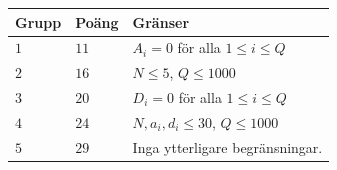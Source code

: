 \noindent
\begin{tabular}{| l | l | p{12cm} |}
  \hline
  \textbf{Grupp} & \textbf{Poäng} & \textbf{Gränser} \\ \hline
  $1$   & $11$       & $A_i = 0$ för alla $1 \leq i \leq Q$\\ \hline
  $2$   & $16$       & $N \leq 5$, $Q  \leq 1000$ \\ \hline
  $3$   & $20$       & $D_i = 0$ för alla $1 \leq i \leq Q$ \\ \hline
  $4$   & $24$       & $N, a_i, d_i \leq 30$, $Q \leq 1000$ \\ \hline
  $5$   & $29$       & Inga ytterligare begränsningar. \\ \hline
\end{tabular}

